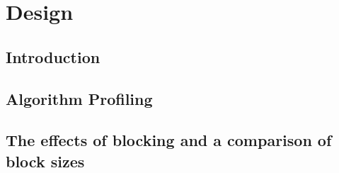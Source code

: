 \chapter{Design}
\label{ch:design}

\section{Introduction}
\label{sec:designIntroduction}


\section{Algorithm Profiling}
\label{sec:algorithmProfiling}


\section{The effects of blocking and a comparison of block sizes}
\label{sec:blockSize}

